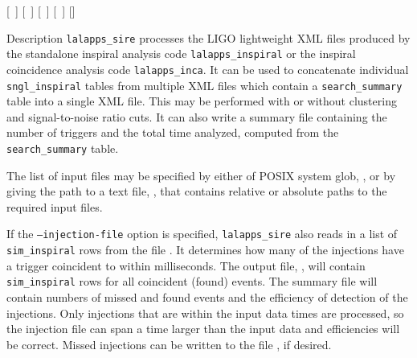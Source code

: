 \begin{entry}
  \newline \hspace*{0.5in}
[~] \newline \hspace*{0.5in}
[~] \newline \hspace*{0.5in}
[~] \newline \hspace*{0.5in}
[~] \newline \hspace*{0.5in}
[] \newline \hspace*{0.5in}
 \newline \hspace*{0.5in}


\item[Description] 
\verb$lalapps_sire$ processes the LIGO lightweight XML files produced by the
standalone inspiral analysis code \verb$lalapps_inspiral$ or the inspiral
coincidence analysis code \verb$lalapps_inca$. It can be used to concatenate
individual \verb$sngl_inspiral$ tables from multiple XML files which contain a
\verb$search_summary$ table into a single XML file. This may be performed with
or without clustering and signal-to-noise ratio cuts. It can also write a
summary file containing the number of triggers and the total time analyzed,
computed from the \verb$search_summary$ table.

The list of input files may be specified by either of POSIX system glob,
, or by giving the path to a text file, ,
that contains relative or absolute paths to the required input files.

If the \texttt{--injection-file} option is specified, \verb$lalapps_sire$ also
reads in a list of \verb$sim_inspiral$ rows from the file .
It determines how many of the injections have a trigger coincident to within
 milliseconds. The output file, , will contain
\verb$sim_inspiral$ rows for all coincident (found) events. The summary file
will contain numbers of missed and found events and the efficiency of
detection of the injections.  Only injections that are within the input data
times are processed, so the injection file can span a time larger than the
input data and efficiencies will be correct. Missed injections can be written
to the file , if desired.


\end{entry}
